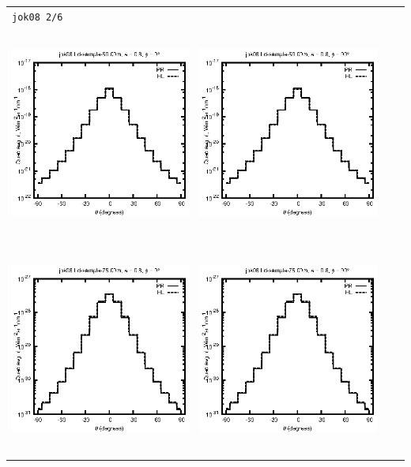 \documentclass[10pt,a4paper]{article}
\begin{document}
\begin{adjustwidth}{-1.2in}{-1.2in}
\begin{tabular}{c c c c}
\multicolumn{4}{l}{\texttt{jok08 2/6}} \\
\includegraphics[height=7cm]{../eps/jok08_Ld_sample_50.00m_fwd.eps} &
\includegraphics[height=7cm]{../eps/jok08_Ld_sample_50.00m_cross.eps} \\
\includegraphics[height=7cm]{../eps/jok08_Ld_sample_75.00m_fwd.eps} &
\includegraphics[height=7cm]{../eps/jok08_Ld_sample_75.00m_cross.eps} \\

\end{tabular}
\end{adjustwidth}
\end{document}
